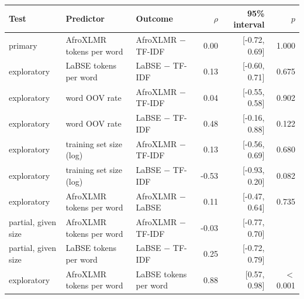 \begin{tabular}{lllrrr}
\toprule
Test & Predictor & Outcome & $\rho$ & 95\% interval & $p$ \\
\midrule
primary & AfroXLMR tokens per word & AfroXLMR $-$ TF-IDF & 0.00 & [-0.72, 0.69] & 1.000 \\
exploratory & LaBSE tokens per word & LaBSE $-$ TF-IDF & 0.13 & [-0.60, 0.71] & 0.675 \\
exploratory & word OOV rate & AfroXLMR $-$ TF-IDF & 0.04 & [-0.55, 0.58] & 0.902 \\
exploratory & word OOV rate & LaBSE $-$ TF-IDF & 0.48 & [-0.16, 0.88] & 0.122 \\
exploratory & training set size (log) & AfroXLMR $-$ TF-IDF & 0.13 & [-0.56, 0.69] & 0.680 \\
exploratory & training set size (log) & LaBSE $-$ TF-IDF & -0.53 & [-0.93, 0.20] & 0.082 \\
exploratory & AfroXLMR tokens per word & AfroXLMR $-$ LaBSE & 0.11 & [-0.47, 0.64] & 0.735 \\
partial, given size & AfroXLMR tokens per word & AfroXLMR $-$ TF-IDF & -0.03 & [-0.77, 0.70] &  \\
partial, given size & LaBSE tokens per word & LaBSE $-$ TF-IDF & 0.25 & [-0.72, 0.79] &  \\
exploratory & AfroXLMR tokens per word & LaBSE tokens per word & 0.88 & [0.57, 0.98] & $<$0.001 \\
\bottomrule
\end{tabular}

